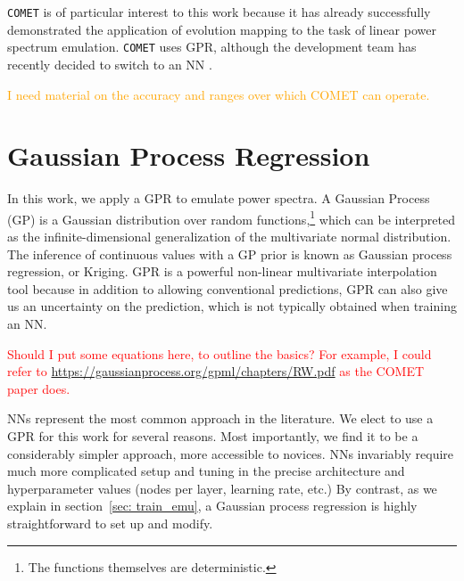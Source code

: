 \verb|COMET| is of particular interest to this work because it has already
successfully demonstrated the application of evolution mapping to the task of
linear power spectrum emulation. \verb|COMET| uses GPR, although the 
development team
has recently decided to switch to an NN .

\textcolor{orange}{I need material on the accuracy and ranges over which
COMET can operate.}



\section{Gaussian Process Regression}
\label{sec: gpr_intro}

In this work, we apply a GPR to emulate power spectra. A Gaussian Process 
(GP) is a Gaussian distribution over random functions,\footnote{The functions
themselves are deterministic.} which can be interpreted
as the infinite-dimensional generalization of the multivariate normal
distribution. The inference of continuous values with a GP prior
is known as Gaussian process regression, or Kriging. GPR is a
powerful non-linear multivariate interpolation tool because in addition to
allowing conventional predictions, GPR can also give us an uncertainty on the
prediction, which is not typically obtained when training an NN.

\textcolor{red}{Should I put some equations here, to outline the basics?
For example, I could refer to
\url{https://gaussianprocess.org/gpml/chapters/RW.pdf} as the COMET paper
does.}

NNs represent the most common approach in the literature. We elect to use a
GPR for this work for several reasons. Most importantly, we find it to be
a considerably simpler approach, more accessible to novices.
NNs invariably require much more complicated setup and tuning in the precise 
architecture and hyperparameter values (nodes per layer, learning rate, etc.) 
By contrast, as we explain in section~\ref{sec: train_emu}, a Gaussian
process regression is highly straightforward to set up and modify.

